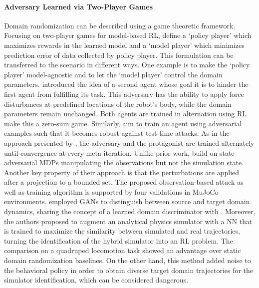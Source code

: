 \documentclass[utf8]{frontiersSCNS} %
\begin{document}
\paragraph*{Adversary Learned via Two-Player Games}
%
Domain randomization can be described using a game theoretic framework.
Focusing on two-player games for model-based \ac{RL}, \citet{Rajeswaran_Kumar_20} define a \enquote*{policy player} which maximizes rewards in the learned model and a \enquote*{model player} which minimizes prediction error of data collected by policy player.
This formulation can be transferred to the \simtoreal scenario in different ways.
One example is to make the \enquote*{policy player} model-agnostic and to let the \enquote*{model player} control the domain parameters.
%
\citet{Pinto_Gupta_17} introduced the idea of a second agent whose goal it is to hinder the first agent from fulfilling its task.
This adversary has the ability to apply force disturbances at predefined locations of the robot's body, while the domain parameters remain unchanged.
Both agents are trained in alternation using \ac{RL} make this a zero-sum game.
%
Similarly, \citet{Zhang_Chen_Hsieh_21} aim to train an agent using adversarial examples such that it becomes robust against test-time attacks. %
As in the approach presented by \citet{Pinto_Gupta_17}, the adversary and the protagonist are trained alternately until convergence at every meta-iteration.
Unlike prior work, \citet{Zhang_Chen_Hsieh_21} build on state-adversarial \acp{MDP} manipulating the observations but not the simulation state.
Another key property of their approach is that the perturbations are applied after a projection to a bounded set.
The proposed observation-based attack as well as training algorithm is supported by four \simtosim validations in MuJoCo environments.
%
\citet{Jiang_Tan_21} employed \acp{GAN} to distinguish between source and target domain dynamics, sharing the concept of a learned domain discriminator with \citet{Mehta_Paull_19}.
Moreover, the authors proposed to augment an analytical physics simulator with a \ac{NN} that is trained to maximize the similarity between simulated and real trajectories, turning the identification of the hybrid simulator into an \ac{RL} problem.
The comparison on a \simtoreal quadruped locomotion task showed an advantage over static domain randomization baselines.
On the other hand, this method added noise to the behavioral policy in order to obtain diverse target domain trajectories for the simulator identification, which can be considered dangerous.
\end{document}
